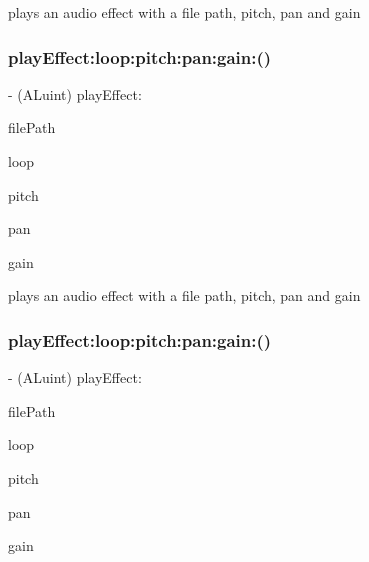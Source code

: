 plays an audio effect with a file path, pitch, pan and gain \mbox{\label{interfaceSimpleAudioEngine_ac3e279ef9259ed8c9cb15dc1341c62e6}} 
\subsubsection{\texorpdfstring{play\+Effect\+:loop\+:pitch\+:pan\+:gain\+:()}{playEffect:loop:pitch:pan:gain:()}\hspace{0.1cm}{\footnotesize\ttfamily [2/4]}}
{\footnotesize\ttfamily -\/ (A\+Luint) play\+Effect\+: \begin{DoxyParamCaption}\item[{(N\+S\+String $\ast$)}]{file\+Path }\item[{loop:(B\+O\+OL)}]{loop }\item[{pitch:(Float32)}]{pitch }\item[{pan:(Float32)}]{pan }\item[{gain:(Float32)}]{gain }\end{DoxyParamCaption}}

plays an audio effect with a file path, pitch, pan and gain \mbox{\label{interfaceSimpleAudioEngine_ac3e279ef9259ed8c9cb15dc1341c62e6}} 
\subsubsection{\texorpdfstring{play\+Effect\+:loop\+:pitch\+:pan\+:gain\+:()}{playEffect:loop:pitch:pan:gain:()}\hspace{0.1cm}{\footnotesize\ttfamily [3/4]}}
{\footnotesize\ttfamily -\/ (A\+Luint) play\+Effect\+: \begin{DoxyParamCaption}\item[{(N\+S\+String $\ast$)}]{file\+Path }\item[{loop:(B\+O\+OL)}]{loop }\item[{pitch:(Float32)}]{pitch }\item[{pan:(Float32)}]{pan }\item[{gain:(Float32)}]{gain }\end{DoxyParamCaption}}

